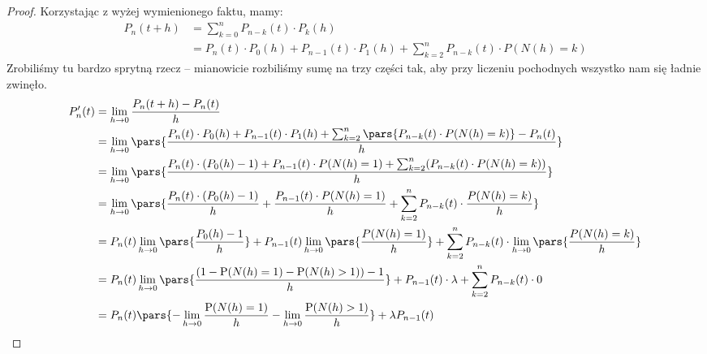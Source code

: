 \begin{proof}
	Korzystając z wyżej wymienionego faktu, mamy:
	\begin{align*}
		P_n(t + h)
		 & = \sum_{k=0}^n P_{n-k}(t) \cdot P_k(h)                                                      \\
		 & = P_n(t) \cdot P_0(h) + P_{n-1}(t) \cdot P_1(h) + \sum_{k=2}^n P_{n-k}(t) \cdot P(N(h) = k)
	\end{align*}
	Zrobiliśmy tu bardzo sprytną rzecz -- mianowicie rozbiliśmy sumę na trzy części tak, aby przy liczeniu pochodnych wszystko nam się ładnie zwinęło.
	\begin{align*}
		P_n'(t)
		 & = \lim_{h \rightarrow 0} \frac{P_n(t + h) - P_n(t)}{h}                                                                                                                                                         \\
		 & =  \lim_{h \rightarrow 0} \pars{ \frac{
				P_n(t) \cdot P_0(h) + P_{n-1}(t) \cdot P_1(h) + \sum_{k=2}^n \pars{P_{n-k}(t) \cdot P(N(h) = k)} - P_n(t)}{h}
		}                                                                                                                                                                                                                 \\
		 & =  \lim_{h \rightarrow 0} \pars{ \frac{
				P_n(t) \cdot (P_0(h) - 1) + P_{n-1}(t) \cdot P(N(h)=1) + \sum_{k=2}^n (P_{n-k}(t) \cdot P(N(h) = k))}{h}
		}                                                                                                                                                                                                                 \\
		 & =  \lim_{h \rightarrow 0} \pars{
			\frac{P_n(t) \cdot (P_0(h) - 1)}{h}
			+ \frac{P_{n-1}(t)\cdot P(N(h) = 1)}{h}
		+ \sum_{k=2}^n P_{n-k}(t) \cdot \frac{P(N(h) = k)}{h}}                                                                                                                                                            \\
		 & = P_n(t) \lim_{h \rightarrow 0} \pars{\frac{P_0(h) - 1}{h}} + P_{n-1}(t) \lim_{h \rightarrow 0} \pars{\frac{P(N(h)=1)}{h}} + \sum_{k=2}^n P_{n-k}(t) \cdot \lim_{h \rightarrow 0} \pars{\frac{P(N(h) = k)}{h}} \\
		 & = P_n(t) \lim_{h \rightarrow 0} \pars{\frac{(1 - \mathrm{P}(N(h) = 1) - \mathrm{P}(N(h) > 1)) - 1}{h}} + P_{n-1}(t) \cdot \lambda + \sum_{k=2}^n P_{n-k}(t) \cdot 0                                            \\
		 & = P_n(t) \pars{-\lim_{h \rightarrow 0}\frac{\mathrm{P}(N(h)=1)}{h} - \lim_{h \rightarrow 0} \frac{\mathrm{P}(N(h)>1)}{h}} + \lambda P_{n-1}(t)                                                                 \\

\end{align*}
\end{proof}

